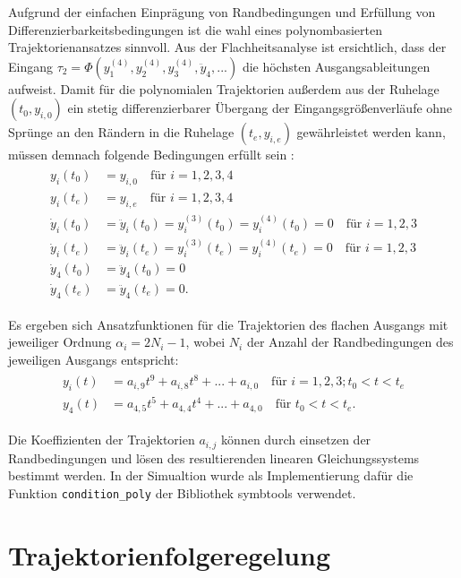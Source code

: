 Aufgrund der einfachen Einprägung von Randbedingungen und Erfüllung von Differenzierbarkeitsbedingungen ist die wahl eines polynombasierten Trajektorienansatzes sinnvoll. Aus der Flachheitsanalyse ist ersichtlich, dass der Eingang $\tau_2 = \Phi(y_1^{(4)}, y_2^{(4)}, y_3^{(4)}, \ddot{y}_4, ...)$ die höchsten Ausgangsableitungen aufweist. Damit für die polynomialen Trajektorien außerdem aus der Ruhelage $(t_0, y_{i, 0})$  ein stetig differenzierbarer Übergang der Eingangsgrößenverläufe ohne Sprünge an den Rändern in die Ruhelage $(t_e, y_{i, e})$ gewährleistet werden kann, müssen demnach folgende Bedingungen erfüllt sein \cite[S. 230]{NLRT_Roebenack}:
\begin{align}
	\begin{split}
	y_i(t_0) &= y_{i, 0}  \quad \text{für } i = 1,2,3,4 \\
	y_i(t_e) &= y_{i, e}  \quad \text{für } i = 1,2,3,4 \\
	\dot{y}_i(t_0) &= \ddot{y}_i(t_0) = y_i^{(3)}(t_0) = y_i^{(4)}(t_0) = 0 \quad \text{für } i = 1,2,3 \\
	\dot{y}_i(t_e) &= \ddot{y}_i(t_e) = y_i^{(3)}(t_e) = y_i^{(4)}(t_e) = 0 \quad \text{für } i = 1,2,3 \\
	\dot{y}_4(t_0) &= \ddot{y}_4(t_0) = 0 \\
	\dot{y}_4(t_e) &= \ddot{y}_4(t_e) = 0.
	\end{split}
\end{align}

Es ergeben sich Ansatzfunktionen für die Trajektorien des flachen Ausgangs mit jeweiliger Ordnung $\alpha_i = 2 N_i - 1$, wobei $N_i$ der Anzahl der Randbedingungen des jeweiligen Ausgangs entspricht:
\begin{align}
	\begin{split}
	y_i(t) &= a_{i, 9} t^9 + a_{i, 8} t^8 + ... + a_{i, 0} \quad \text{für }  i = 1,2,3; t_0 < t < t_e \\
	y_4(t) &= a_{4, 5} t^5 + a_{4, 4} t^4 + ... + a_{4, 0} \quad \text{für } t_0 < t < t_e.
	\end{split}
\end{align}

Die Koeffizienten der Trajektorien $a_{i, j}$ können durch einsetzen der Randbedingungen und lösen des resultierenden linearen Gleichungssystems bestimmt werden. In der Simualtion wurde als Implementierung dafür die Funktion \texttt{condition\_poly} der Bibliothek symbtools verwendet.


\section{Trajektorienfolgeregelung}

